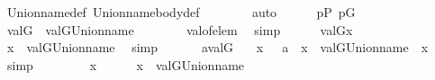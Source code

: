 \begin{isabellebody}
\ Union{\isacharunderscore}{\kern0pt}name{\isacharunderscore}{\kern0pt}def\ Union{\isacharunderscore}{\kern0pt}name{\isacharunderscore}{\kern0pt}body{\isacharunderscore}{\kern0pt}def\isanewline
\ \ \ \ \ \ \isamarkupfalse%
\ auto\isanewline
\ \ \ \ \isamarkupfalse%
\ {\isacartoucheopen}p{\isasymin}P{\isacartoucheclose}\ {\isacartoucheopen}p{\isasymin}G{\isacartoucheclose}\ \isamarkupfalse%
\ {\isachardoublequoteopen}val{\isacharparenleft}{\kern0pt}G{\isacharcomma}{\kern0pt}{\isasymtheta}{\isacharparenright}{\kern0pt}\ {\isasymin}\ val{\isacharparenleft}{\kern0pt}G{\isacharcomma}{\kern0pt}Union{\isacharunderscore}{\kern0pt}name{\isacharparenleft}{\kern0pt}{\isasymtau}{\isacharparenright}{\kern0pt}{\isacharparenright}{\kern0pt}{\isachardoublequoteclose}\isanewline
\ \ \ \ \ \ \isamarkupfalse%
\ val{\isacharunderscore}{\kern0pt}of{\isacharunderscore}{\kern0pt}elem\ \isamarkupfalse%
\ simp\isanewline
\ \ \ \ \isamarkupfalse%
\ {\isacartoucheopen}val{\isacharparenleft}{\kern0pt}G{\isacharcomma}{\kern0pt}{\isasymtheta}{\isacharparenright}{\kern0pt}{\isacharequal}{\kern0pt}x{\isacartoucheclose}\ \isamarkupfalse%
\ {\isachardoublequoteopen}x\ {\isasymin}\ val{\isacharparenleft}{\kern0pt}G{\isacharcomma}{\kern0pt}Union{\isacharunderscore}{\kern0pt}name{\isacharparenleft}{\kern0pt}{\isasymtau}{\isacharparenright}{\kern0pt}{\isacharparenright}{\kern0pt}{\isachardoublequoteclose}\ \isamarkupfalse%
\ simp\isanewline
\ \ \isacommand{{\isacharbraceright}{\kern0pt}}\isamarkupfalse%
\isanewline
\ \ \isamarkupfalse%
\ {\isacartoucheopen}a{\isacharequal}{\kern0pt}val{\isacharparenleft}{\kern0pt}G{\isacharcomma}{\kern0pt}{\isasymtau}{\isacharparenright}{\kern0pt}{\isacartoucheclose}\ \isamarkupfalse%
\ {}{\isacharcolon}{\kern0pt}\ {\isachardoublequoteopen}x\ {\isasymin}\ {\isasymUnion}\ a\ {\isasymLongrightarrow}\ x\ {\isasymin}\ val{\isacharparenleft}{\kern0pt}G{\isacharcomma}{\kern0pt}Union{\isacharunderscore}{\kern0pt}name{\isacharparenleft}{\kern0pt}{\isasymtau}{\isacharparenright}{\kern0pt}{\isacharparenright}{\kern0pt}{\isachardoublequoteclose}\ \ x\ \isamarkupfalse%
\ simp\isanewline
\ \ \isacommand{{\isacharbraceleft}{\kern0pt}}\isamarkupfalse%
\isanewline
\ \ \ \ \isamarkupfalse%
\ x\isanewline
\ \ \ \ \isamarkupfalse%
\ {\isachardoublequoteopen}x\ {\isasymin}\ {\isacharparenleft}{\kern0pt}val{\isacharparenleft}{\kern0pt}G{\isacharcomma}{\kern0pt}Union{\isacharunderscore}{\kern0pt}name{\isacharparenleft}{\kern0pt}{\isasymtau}{\isacharparenright}{\kern0pt}{\isacharparenright}{\kern0pt}{\isacharparenright}{\kern0pt}{\isachardoublequoteclose}\isanewline

\end{isabellebody}

